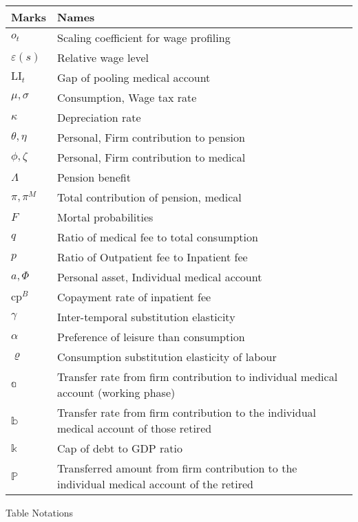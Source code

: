 \begin{longtable}[]{@{}ll@{}}
\toprule
\textbf{Marks} & \textbf{Names}\tabularnewline
\midrule
\endhead
\(o_{t}\) & Scaling coefficient for wage profiling\tabularnewline
\(\varepsilon\left( s \right)\) & Relative wage level\tabularnewline
\(\text{LI}_{t}\) & Gap of pooling medical account\tabularnewline
\(\mu,\sigma\) & Consumption, Wage tax rate\tabularnewline
\(\kappa\) & Depreciation rate\tabularnewline
\(\theta,\eta\) & Personal, Firm contribution to pension\tabularnewline
\(\phi,\zeta\) & Personal, Firm contribution to medical\tabularnewline
\(\Lambda\) & Pension benefit\tabularnewline
\(\pi,\pi^{M}\) & Total contribution of pension, medical\tabularnewline
\(F\) & Mortal probabilities\tabularnewline
\(q\) & Ratio of medical fee to total consumption\tabularnewline
\(p\) & Ratio of Outpatient fee to Inpatient fee\tabularnewline
\(a,\Phi\) & Personal asset, Individual medical account\tabularnewline
\(\text{cp}^{B}\) & Copayment rate of inpatient fee\tabularnewline
\(\gamma\) & Inter-temporal substitution elasticity\tabularnewline
\(\alpha\) & Preference of leisure than consumption\tabularnewline
\(\varrho\) & Consumption substitution elasticity of
labour\tabularnewline
\(\mathbb{a}\) & Transfer rate from firm contribution to individual
medical account (working phase)\tabularnewline
\(\mathbb{b}\) & Transfer rate from firm contribution to the individual
medical account of those retired\tabularnewline
\(\mathbb{k}\) & Cap of debt to GDP ratio\tabularnewline
\(\mathbb{P}\) & Transferred amount from firm contribution to the
individual medical account of the retired\tabularnewline
\bottomrule
\end{longtable}

Table Notations
